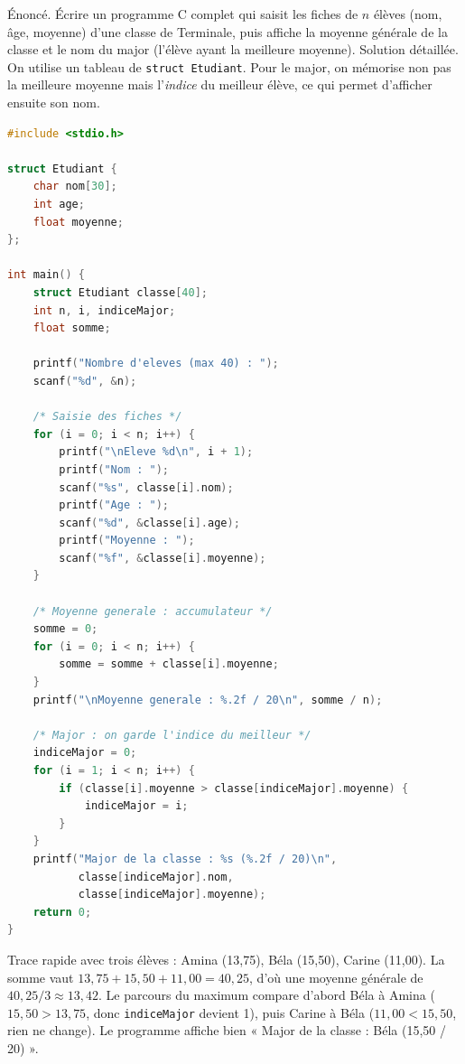 \documentclass[11pt]{article}
\begin{document}
\begin{exoresolu}
Énoncé. Écrire un programme C complet qui saisit les fiches de $n$ élèves (nom, âge, moyenne) d'une classe de Terminale, puis affiche la moyenne générale de la classe et le nom du major (l'élève ayant la meilleure moyenne).
\tcblower
Solution détaillée. On utilise un tableau de \texttt{struct Etudiant}. Pour le major, on mémorise non pas la meilleure moyenne mais l'\emph{indice} du meilleur élève, ce qui permet d'afficher ensuite son nom.
\begin{lstlisting}[language=C]
#include <stdio.h>

struct Etudiant {
    char nom[30];
    int age;
    float moyenne;
};

int main() {
    struct Etudiant classe[40];
    int n, i, indiceMajor;
    float somme;

    printf("Nombre d'eleves (max 40) : ");
    scanf("%d", &n);

    /* Saisie des fiches */
    for (i = 0; i < n; i++) {
        printf("\nEleve %d\n", i + 1);
        printf("Nom : ");
        scanf("%s", classe[i].nom);
        printf("Age : ");
        scanf("%d", &classe[i].age);
        printf("Moyenne : ");
        scanf("%f", &classe[i].moyenne);
    }

    /* Moyenne generale : accumulateur */
    somme = 0;
    for (i = 0; i < n; i++) {
        somme = somme + classe[i].moyenne;
    }
    printf("\nMoyenne generale : %.2f / 20\n", somme / n);

    /* Major : on garde l'indice du meilleur */
    indiceMajor = 0;
    for (i = 1; i < n; i++) {
        if (classe[i].moyenne > classe[indiceMajor].moyenne) {
            indiceMajor = i;
        }
    }
    printf("Major de la classe : %s (%.2f / 20)\n",
           classe[indiceMajor].nom,
           classe[indiceMajor].moyenne);
    return 0;
}
\end{lstlisting}
Trace rapide avec trois élèves : Amina (13,75), Béla (15,50), Carine (11,00). La somme vaut $13{,}75 + 15{,}50 + 11{,}00 = 40{,}25$, d'où une moyenne générale de $40{,}25 / 3 \approx 13{,}42$. Le parcours du maximum compare d'abord Béla à Amina ($15{,}50 > 13{,}75$, donc \texttt{indiceMajor} devient 1), puis Carine à Béla ($11{,}00 < 15{,}50$, rien ne change). Le programme affiche bien « Major de la classe : Béla (15,50 / 20) ».
\end{exoresolu}
\end{document}
